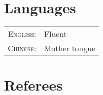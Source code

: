 \documentclass[a4paper,10pt]{article} %
\begin{document}

\section{Languages}

\begin{tabular}{rl}
\textsc{English:} & Fluent\\

\textsc{Chinese:} & Mother tongue\\
\end{tabular}


\section{Referees}
\end{document}
